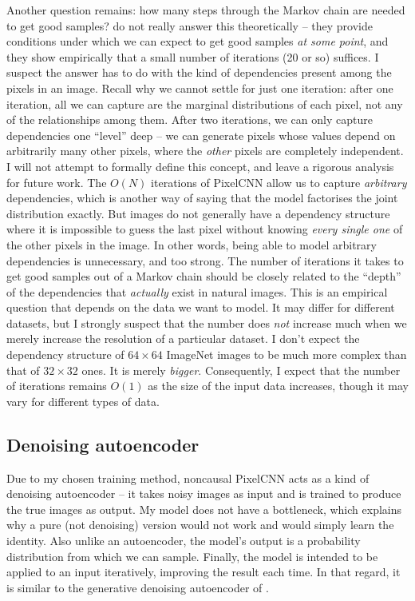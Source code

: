 \documentclass[11pt, a4paper, openany]{book}
\newcommand{\nquote}[1]{``{#1}''}
\begin{document}
Another question remains: how many steps through the Markov chain are needed to get good samples? \citet{denoisinggenerative} do not really answer this theoretically -- they provide conditions under which we can expect to get good samples \emph{at some point}, and they show empirically that a small number of iterations (20 or so) suffices. I suspect the answer has to do with the kind of dependencies present among the pixels in an image. Recall why we cannot settle for just one iteration: after one iteration, all we can capture are the marginal distributions of each pixel, not any of the relationships among them. After two iterations, we can only capture dependencies one \nquote{level} deep -- we can generate pixels whose values depend on arbitrarily many other pixels, where the \emph{other} pixels are completely independent. I will not attempt to formally define this concept, and leave a rigorous analysis for future work. The $O(N)$ iterations of PixelCNN allow us to capture \emph{arbitrary} dependencies, which is another way of saying that the model factorises the joint distribution exactly. But images do not generally have a dependency structure where it is impossible to guess the last pixel without knowing \emph{every single one} of the other pixels in the image. In other words, being able to model arbitrary dependencies is unnecessary, and too strong. The number of iterations it takes to get good samples out of a Markov chain should be closely related to the \nquote{depth} of the dependencies that \emph{actually} exist in natural images. This is an empirical question that depends on the data we want to model. It may differ for different datasets, but I strongly suspect that the number does \emph{not} increase much when we merely increase the resolution of a particular dataset. I don't expect the dependency structure of $64\times 64$ ImageNet images to be much more complex than that of $32 \times 32$ ones. It is merely \emph{bigger}. Consequently, I expect that the number of iterations remains $O(1)$ as the size of the input data increases, though it may vary for different types of data.

\subsection{Denoising autoencoder}

Due to my chosen training method, noncausal PixelCNN acts as a kind of denoising autoencoder \citep{denoisingautoencoder, stackeddenoising} -- it takes noisy images as input and is trained to produce the true images as output. My model does not have a bottleneck, which explains why a pure (not denoising) version would not work and would simply learn the identity. Also unlike an autoencoder, the model's output is a probability distribution from which we can sample. Finally, the model is intended to be applied to an input iteratively, improving the result each time. In that regard, it is similar to the generative denoising autoencoder of \citet{denoisinggenerative}.
\end{document}
